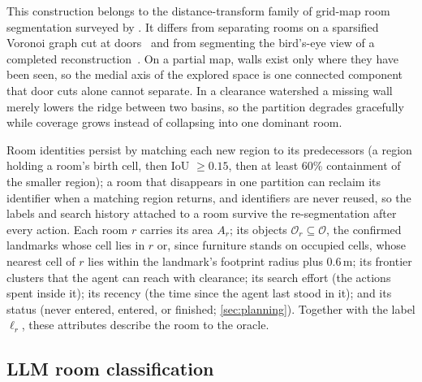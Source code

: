 \documentclass[10pt]{article}
\newcommand{\Ob}{\mathcal{O}}
\begin{document}
This construction belongs to the distance-transform family of grid-map room segmentation surveyed by
\citet{bormann2016room}. It differs from separating rooms on a sparsified Voronoi graph cut at
doors~\citep{honerkamp2024language,mohammadi2025more} and from segmenting the bird's-eye view of a completed
reconstruction~\citep{werby2024hierarchical}. On a partial map, walls exist only where they have been seen, so the
medial axis of the explored space is one connected component that door cuts alone cannot separate. In a clearance
watershed a missing wall merely lowers the ridge between two basins, so the partition degrades gracefully while
coverage grows instead of collapsing into one dominant room.

Room identities persist by matching each new region to its predecessors (a region holding a room's birth cell, then
IoU $\geq 0.15$, then at least 60\% containment of the smaller region); a room that disappears in one partition can
reclaim its identifier when a matching region returns, and identifiers are never reused, so the labels and search
history attached to a room survive the re-segmentation after every action. Each room $r$ carries its area $A_r$; its
objects $\Ob_r \subseteq \Ob$, the confirmed landmarks whose cell lies in $r$ or, since furniture stands on occupied
cells, whose nearest cell of $r$ lies within the landmark's footprint radius plus 0.6\,m; its frontier clusters that
the agent can reach with clearance; its search effort (the actions spent inside it); its recency (the time since the
agent last stood in it); and its status (never entered, entered, or finished; \cref{sec:planning}). Together with the label
$\ell_r$, these attributes describe the room to the oracle.

\subsection{LLM room classification}\label{sec:perception-labels}
\end{document}
